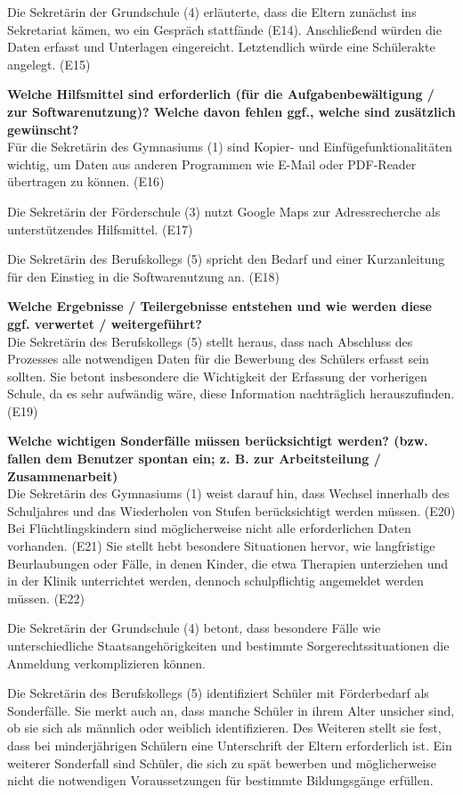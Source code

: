 Die Sekretärin der Grundschule (4) erläuterte, dass die Eltern zunächst ins Sekretariat kämen, wo ein Gespräch stattfände (E14). Anschließend würden die Daten erfasst und Unterlagen eingereicht. Letztendlich würde eine Schülerakte angelegt. (E15)

\textbf{Welche Hilfsmittel sind erforderlich (für die Aufgabenbewältigung / zur Softwarenutzung)? Welche davon fehlen ggf., welche sind zusätzlich gewünscht?}\\
Für die Sekretärin des Gymnasiums (1) sind Kopier- und Einfügefunktionalitäten wichtig, um Daten aus anderen Programmen wie E-Mail oder PDF-Reader übertragen zu können. (E16)

Die Sekretärin der Förderschule (3) nutzt Google Maps zur Adressrecherche als unterstützendes Hilfsmittel. (E17)

Die Sekretärin des Berufskollegs (5) spricht den Bedarf und einer Kurzanleitung für den Einstieg in die Softwarenutzung an. (E18)

\textbf{Welche Ergebnisse / Teilergebnisse entstehen und wie werden diese ggf. verwertet / weitergeführt?}\\
Die Sekretärin des Berufskollegs (5) stellt heraus, dass nach Abschluss des Prozesses alle notwendigen Daten für die Bewerbung des Schülers erfasst sein sollten. Sie betont insbesondere die Wichtigkeit der Erfassung der vorherigen Schule, da es sehr aufwändig wäre, diese Information nachträglich herauszufinden.(E19) 

\textbf{Welche wichtigen Sonderfälle müssen berücksichtigt werden? (bzw. fallen dem Benutzer spontan ein; z. B. zur Arbeitsteilung / Zusammenarbeit)}\\
Die Sekretärin des Gymnasiums (1) weist darauf hin, dass Wechsel innerhalb des Schuljahres und das Wiederholen von Stufen berücksichtigt werden müssen. (E20) Bei Flüchtlingskindern sind möglicherweise nicht alle erforderlichen Daten vorhanden. (E21) Sie stellt hebt besondere Situationen hervor, wie langfristige Beurlaubungen oder Fälle, in denen Kinder, die etwa Therapien unterziehen und in der Klinik unterrichtet werden, dennoch schulpflichtig angemeldet werden müssen. (E22)

Die Sekretärin der Grundschule (4) betont, dass besondere Fälle wie unterschiedliche Staatsangehörigkeiten und bestimmte Sorgerechtssituationen die Anmeldung verkomplizieren können.

Die Sekretärin des Berufskollegs (5) identifiziert Schüler mit Förderbedarf als Sonderfälle. Sie merkt auch an, dass manche Schüler in ihrem Alter unsicher sind, ob sie sich als männlich oder weiblich identifizieren. Des Weiteren stellt sie fest, dass bei minderjährigen Schülern eine Unterschrift der Eltern erforderlich ist. Ein weiterer Sonderfall sind Schüler, die sich zu spät bewerben und möglicherweise nicht die notwendigen Voraussetzungen für bestimmte Bildungsgänge erfüllen. 

